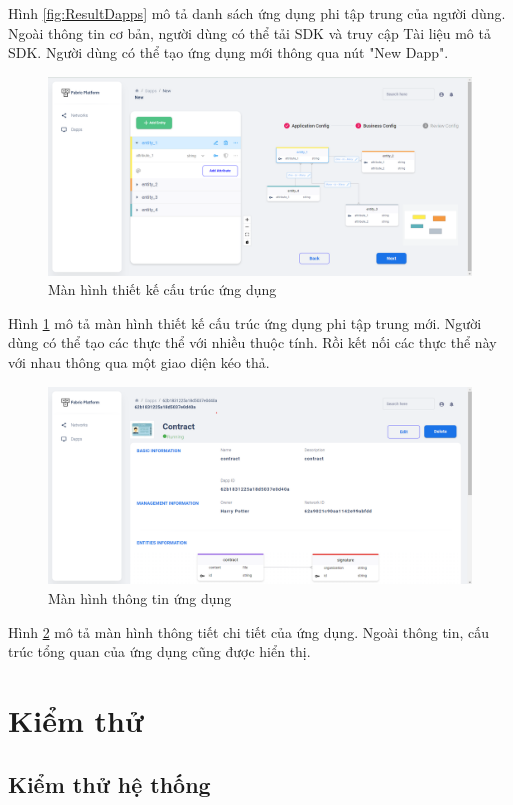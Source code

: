 \documentclass[../DoAn.tex]{subfiles}
\begin{document}
Hình \ref{fig:ResultDapps} mô tả danh sách ứng dụng phi tập trung của người
dùng. Ngoài thông tin cơ bản, người dùng có thể tải SDK và truy cập Tài liệu mô
tả SDK. Người dùng có thể tạo ứng dụng mới thông qua nút "New Dapp".

\begin{figure}[H]
    \centering
    \includegraphics[width=0.75\linewidth]{Hinhve/DoAn-ResultDappCreate.png}
    \caption{Màn hình thiết kế cấu trúc ứng dụng}
    \label{fig:ResultDappCreate}
\end{figure}

Hình \ref{fig:ResultDappCreate} mô tả màn hình thiết kế cấu trúc ứng dụng phi
tập trung mới. Người dùng có thể tạo các thực thể với nhiều thuộc tính. Rồi kết
nối các thực thể này với nhau thông qua một giao diện kéo thả.

\begin{figure}[H]
    \centering
    \includegraphics[width=0.75\linewidth]{Hinhve/DoAn-ResultDappDetail.png}
    \caption{Màn hình thông tin ứng dụng}
    \label{fig:ResultDappDetail}
\end{figure}

Hình \ref{fig:ResultDappDetail} mô tả màn hình thông tiết chi tiết của ứng
dụng. Ngoài thông tin, cấu trúc tổng quan của ứng dụng cũng được hiển thị.

\section{Kiểm thử}

\subsection{Kiểm thử hệ thống}
\end{document}
